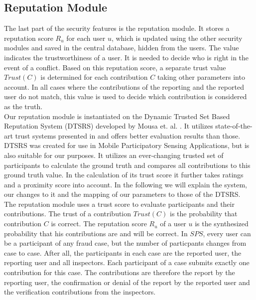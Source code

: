 \subsection{Reputation Module}\label{sec:Reputation Module} The last part of the security features is the reputation module. It stores a reputation score $R_u$ for each user $u$, which is updated using the other security modules and saved in the central database, hidden from the users. The value indicates the trustworthiness of a user. It is needed to decide who is right in the event of a conflict. Based on this reputation score, a separate trust value $Trust(C)$ is determined for each contribution $C$ taking other parameters into account. In all cases where the contributions of the reporting and the reported user do not match, this value is used to decide which contribution is considered as the truth. \\

Our reputation module is instantiated on the Dynamic Trusted Set Based Reputation System (DTSRS) developed by Mousa et. al. \cite{mousa2017reputation}. It utilizes state-of-the-art trust systems presented in \cite{mousa2015trust} and offers better evaluation results than those. DTSRS was created for use in Mobile Participatory Sensing Applications, but is also suitable for our purposes. It utilizes an ever-changing trusted set of participants to calculate the ground truth and compares all contributions to this ground truth value. In the calculation of its trust score it further takes ratings and a proximity score into account. In the following we will explain the system, our changes to it and the mapping of our parameters to those of the DTSRS. \\

The reputation module uses a trust score to evaluate participants and their contributions. The trust of a contribution $Trust(C)$ is the probability that contribution $C$ is correct. The reputation score $R_u$ of a user $u$ is the synthesized probability that his contributions are and will be correct. In $SPS$, every user can be a participant of any fraud case, but the number of particpants changes from case to case. After all, the participants in each case are the reported user, the reporting user and all inspectors. Each participant of a case submits exactly one contribution for this case. The contributions are therefore the report by the reporting user, the confirmation or denial of the report by the reported user and the verification contributions from the inspectors.\\

